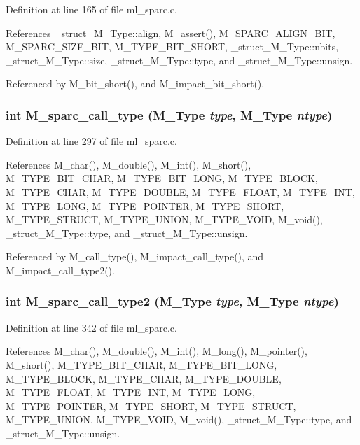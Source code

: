 Definition at line 165 of file ml\_\-sparc.c.

References \_\-struct\_\-M\_\-Type::align, M\_\-assert(), M\_\-SPARC\_\-ALIGN\_\-BIT, M\_\-SPARC\_\-SIZE\_\-BIT, M\_\-TYPE\_\-BIT\_\-SHORT, \_\-struct\_\-M\_\-Type::nbits, \_\-struct\_\-M\_\-Type::size, \_\-struct\_\-M\_\-Type::type, and \_\-struct\_\-M\_\-Type::unsign.

Referenced by M\_\-bit\_\-short(), and M\_\-impact\_\-bit\_\-short().
\subsubsection{\setlength{\rightskip}{0pt plus 5cm}int M\_\-sparc\_\-call\_\-type (\bf{M\_\-Type} {\em type}, \bf{M\_\-Type} {\em ntype})}\label{m__sparc_8h_a039a192cee4a703c159455243cadc26}




Definition at line 297 of file ml\_\-sparc.c.

References M\_\-char(), M\_\-double(), M\_\-int(), M\_\-short(), M\_\-TYPE\_\-BIT\_\-CHAR, M\_\-TYPE\_\-BIT\_\-LONG, M\_\-TYPE\_\-BLOCK, M\_\-TYPE\_\-CHAR, M\_\-TYPE\_\-DOUBLE, M\_\-TYPE\_\-FLOAT, M\_\-TYPE\_\-INT, M\_\-TYPE\_\-LONG, M\_\-TYPE\_\-POINTER, M\_\-TYPE\_\-SHORT, M\_\-TYPE\_\-STRUCT, M\_\-TYPE\_\-UNION, M\_\-TYPE\_\-VOID, M\_\-void(), \_\-struct\_\-M\_\-Type::type, and \_\-struct\_\-M\_\-Type::unsign.

Referenced by M\_\-call\_\-type(), M\_\-impact\_\-call\_\-type(), and M\_\-impact\_\-call\_\-type2().
\subsubsection{\setlength{\rightskip}{0pt plus 5cm}int M\_\-sparc\_\-call\_\-type2 (\bf{M\_\-Type} {\em type}, \bf{M\_\-Type} {\em ntype})}\label{m__sparc_8h_ed61a397557aa9e21962de679ee7acc8}




Definition at line 342 of file ml\_\-sparc.c.

References M\_\-char(), M\_\-double(), M\_\-int(), M\_\-long(), M\_\-pointer(), M\_\-short(), M\_\-TYPE\_\-BIT\_\-CHAR, M\_\-TYPE\_\-BIT\_\-LONG, M\_\-TYPE\_\-BLOCK, M\_\-TYPE\_\-CHAR, M\_\-TYPE\_\-DOUBLE, M\_\-TYPE\_\-FLOAT, M\_\-TYPE\_\-INT, M\_\-TYPE\_\-LONG, M\_\-TYPE\_\-POINTER, M\_\-TYPE\_\-SHORT, M\_\-TYPE\_\-STRUCT, M\_\-TYPE\_\-UNION, M\_\-TYPE\_\-VOID, M\_\-void(), \_\-struct\_\-M\_\-Type::type, and \_\-struct\_\-M\_\-Type::unsign.


